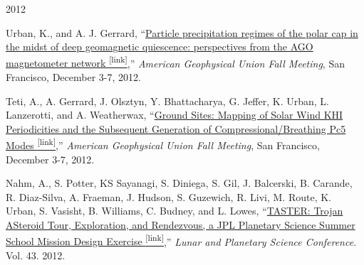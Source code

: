 \documentclass[10pt]{article}
\begin{document}
\vspace{0.5cm}
\begin{center} \Large{2012} \end{center}
\normalsize
\begin{itemize*}
  \item Urban, K., and A. J. Gerrard,
    ``\href{https://scholar.google.com/citations?view_op=view_citation&hl=en&user=KTLuoQkAAAAJ&citation_for_view=KTLuoQkAAAAJ:Se3iqnhoufwC}{Particle precipitation regimes of the polar
    cap in the midst of deep geomagnetic quiescence: perspectives from the
    AGO magnetometer network \textsuperscript{\tiny{[link]}}},'' {\em American Geophysical Union Fall
    Meeting}, San Francisco, December 3-7, 2012.

  \item Teti, A., A. Gerrard, J. Olsztyn, Y. Bhattacharya, G.
    Jeffer, K. Urban, L. Lanzerotti, and A. Weatherwax,
    ``\href{https://scholar.google.com/citations?view_op=view_citation&hl=en&user=KTLuoQkAAAAJ&citation_for_view=KTLuoQkAAAAJ:UebtZRa9Y70C}{Ground
    Sites: Mapping of Solar Wind KHI Periodicities and the Subsequent
    Generation of Compressional/Breathing Pc5 Modes \textsuperscript{\tiny{[link]}}},''
    {\em American Geophysical Union Fall
    Meeting}, San Francisco, December 3-7, 2012.

  \item
    Nahm, A., S. Potter, KS Sayanagi, S. Diniega, S. Gil, J. Balcerski,
    B.  Carande, R. Diaz-Silva, A. Fraeman, J. Hudson, S. Guzewich, R.
    Livi, M.  Route, K. Urban, S. Vasisht, B. Williams, C. Budney, and L. Lowes,
    ``\href{https://scholar.google.com/citations?view_op=view_citation&hl=en&user=KTLuoQkAAAAJ&citation_for_view=KTLuoQkAAAAJ:Tyk-4Ss8FVUC}{TASTER:
    Trojan ASteroid Tour, Exploration, and Rendezvous, a JPL Planetary
    Science Summer School Mission Design Exercise \textsuperscript{\tiny{[link]}}},'' {\em Lunar and
    Planetary Science Conference}. Vol. 43. 2012.
\end{itemize*}
\end{document}
